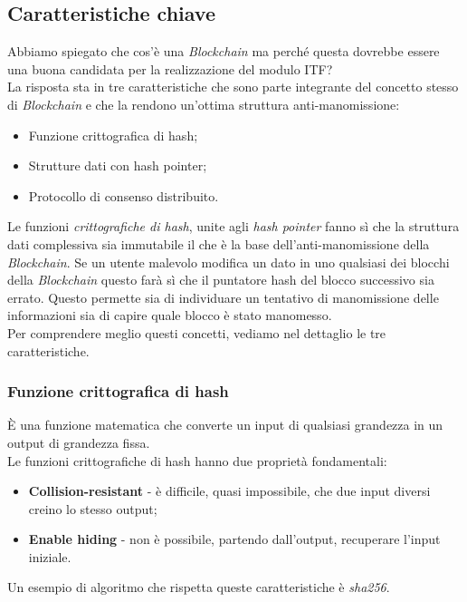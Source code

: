\subsection{Caratteristiche chiave}
Abbiamo spiegato che cos'è una \textit{Blockchain} ma perché questa dovrebbe essere una buona candidata per la realizzazione del modulo \gls{ITF}?\\
La risposta sta in tre caratteristiche che sono parte integrante del concetto stesso di \textit{Blockchain} e che la rendono un'ottima struttura anti-manomissione:
\begin{itemize}
	\item Funzione crittografica di hash;
	\item Strutture dati con hash pointer;
	\item Protocollo di consenso distribuito.
\end{itemize}
Le funzioni \textit{crittografiche di hash}, unite agli \textit{hash pointer} fanno sì che la struttura dati complessiva sia immutabile il che è la base dell'anti-manomissione della \textit{Blockchain}.
Se un utente malevolo modifica un dato in uno qualsiasi dei blocchi della \textit{Blockchain} questo farà sì che il puntatore hash del blocco successivo sia errato. Questo permette sia di individuare un tentativo di manomissione delle informazioni sia di capire quale blocco è stato manomesso.\\
Per comprendere meglio questi concetti, vediamo nel dettaglio le tre caratteristiche.
\subsubsection{Funzione crittografica di hash}
È una funzione matematica che converte un input di qualsiasi grandezza in un output di grandezza fissa.\\
Le funzioni crittografiche di hash hanno due proprietà fondamentali:
\begin{itemize}
	\item \textbf{Collision-resistant} - è difficile, quasi impossibile, che due input diversi creino lo stesso output;
	\item \textbf{Enable hiding} - non è possibile, partendo dall'output, recuperare l'input iniziale.
\end{itemize}
Un esempio di algoritmo che rispetta queste caratteristiche è \emph{\gls{sha256}}\glsfirstoccur.

